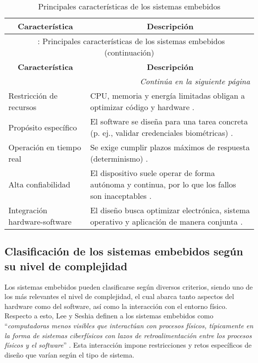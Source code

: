 \begin{longtable}{l|p{10cm}}
    \caption{Principales características de los sistemas embebidos} \label{tab:embedded_characteristics} \\
    \hline
    \multicolumn{1}{c|}{\textbf{Característica}} & \multicolumn{1}{c}{\textbf{Descripción}} \\
    \hline
    \endfirsthead
    
    \multicolumn{2}{c}{\tablename\ \thetable{}: Principales características de los sistemas embebidos (continuación)} \\
    \hline
    \multicolumn{1}{c|}{\textbf{Característica}} & \multicolumn{1}{c}{\textbf{Descripción}} \\
    \hline
    \endhead
    
    \hline
    \multicolumn{2}{r}{\textit{Continúa en la siguiente página}} \\
    \endfoot
    
    \hline
    \endlastfoot
    
    Restricción de recursos & CPU, memoria y energía limitadas obligan a optimizar código y hardware \cite{henriksson_2006}.\\
    Propósito  específico & El software se diseña para una tarea concreta (p. ej., validar credenciales biométricas) \cite{wolf_embedded_2012}.\\
    Operación en tiempo real & Se exige cumplir plazos máximos de respuesta (determinismo) \cite{shyamasundar_validating_2001}.\\
    Alta confiabilidad & El dispositivo suele operar de forma autónoma y continua, por lo que los fallos son inaceptables \cite{windriver_embedded_security}.\\
    Integración hardware-software & El diseño busca optimizar electrónica, sistema operativo y aplicación de manera conjunta \cite{wolf_embedded_2012}.\\
\end{longtable}


\subsection{Clasificación de los sistemas embebidos según su nivel de complejidad}

Los sistemas embebidos pueden clasificarse según diversos criterios, siendo uno de los más relevantes el nivel de complejidad, el cual abarca tanto aspectos del hardware como del software, así como la interacción con el entorno físico. Respecto a esto, Lee y Seshia definen a los sistemas embebidos como ``\textit{computadoras menos visibles que interactúan con procesos físicos, típicamente en la forma de sistemas ciberfísicos con lazos de retroalimentación entre los procesos físicos y el software}'' \cite{lee_introduction_2017}. Esta interacción impone restricciones y retos específicos de diseño que varían según el tipo de sistema.

